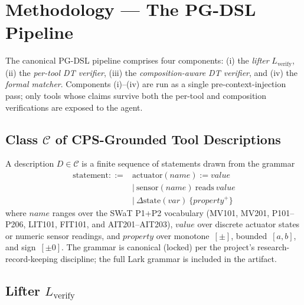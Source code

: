 \section{Methodology --- The PG-DSL Pipeline}
\label{sec:method}

The canonical PG-DSL pipeline comprises four components:
(i) the \emph{lifter} $L_{\text{verify}}$, (ii) the \emph{per-tool DT
verifier}, (iii) the \emph{composition-aware DT verifier}, and
(iv) the \emph{formal matcher}. Components (i)--(iv) are run as a
single pre-context-injection pass; only tools whose claims survive both
the per-tool and composition verifications are exposed to the agent.

\subsection{Class $\mathcal{C}$ of CPS-Grounded Tool Descriptions}
\label{sec:method-grammar}

A description $D \in \mathcal{C}$ is a finite sequence of statements
drawn from the grammar
\[
\begin{aligned}
\text{statement} ::= {}&
  \text{actuator}(\textit{name}) := \textit{value} \\
&\mid\ \text{sensor}(\textit{name})\ \text{reads}\ \textit{value} \\
&\mid\ \Delta\text{state}(\textit{var})\ \{\textit{property}^{+}\}
\end{aligned}
\]
where $\textit{name}$ ranges over the SWaT P1+P2 vocabulary
(MV101, MV201, P101--P206, LIT101, FIT101, and AIT201--AIT203),
$\textit{value}$ over discrete actuator states or numeric sensor
readings, and $\textit{property}$ over monotone~$[\pm]$,
bounded~$[a, b]$, and sign~$[\pm 0]$. The grammar is
canonical (locked) per the project's research-record-keeping
discipline; the full Lark grammar is included in the artifact.

\subsection{Lifter $L_{\text{verify}}$}


